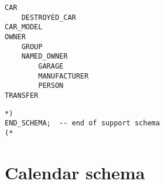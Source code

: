 \documentclass{article}
\begin{document}
\begin{small} 
\begin{verbatim}
CAR
    DESTROYED_CAR
CAR_MODEL
OWNER
    GROUP
    NAMED_OWNER
        GARAGE
        MANUFACTURER
        PERSON
TRANSFER
\end{verbatim} 
\end{small}

\begin{small} 
\begin{verbatim}
*)
END_SCHEMA;  -- end of support schema
(*
\end{verbatim} 
\end{small}

\section{Calendar schema}
\end{document}
